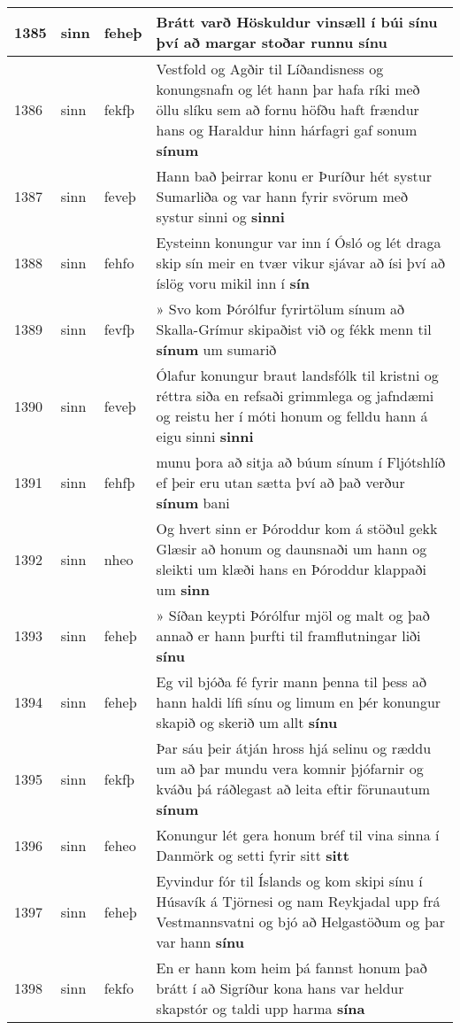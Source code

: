 \documentclass{article}
\begin{document}
\begin{longtable}{p{1cm}|p{1cm}|p{1cm}|p{13cm}}
\hline
1385&sinn&feheþ&Brátt varð Höskuldur vinsæll í búi sínu því að margar stoðar runnu \textbf{sínu} \\
\hline
1386&sinn&fekfþ&Vestfold og Agðir til Líðandisness og konungsnafn og lét hann þar hafa ríki með öllu slíku sem að fornu höfðu haft frændur hans og Haraldur hinn hárfagri gaf sonum \textbf{sínum} \\
\hline
1387&sinn&feveþ&Hann bað þeirrar konu er Þuríður hét systur Sumarliða og var hann fyrir svörum með systur sinni og \textbf{sinni} \\
\hline
1388&sinn&fehfo&Eysteinn konungur var inn í Ósló og lét draga skip sín meir en tvær vikur sjávar að ísi því að íslög voru mikil inn í \textbf{sín} \\
\hline
1389&sinn&fevfþ&» Svo kom Þórólfur fyrirtölum sínum að Skalla-Grímur skipaðist við og fékk menn til \textbf{sínum} um sumarið\\
\hline
1390&sinn&feveþ&Ólafur konungur braut landsfólk til kristni og réttra siða en refsaði grimmlega og jafndæmi og reistu her í móti honum og felldu hann á eigu sinni \textbf{sinni} \\
\hline
1391&sinn&fehfþ&munu þora að sitja að búum sínum í Fljótshlíð ef þeir eru utan sætta því að það verður \textbf{sínum} bani\\
\hline
1392&sinn&nheo&Og hvert sinn er Þóroddur kom á stöðul gekk Glæsir að honum og daunsnaði um hann og sleikti um klæði hans en Þóroddur klappaði um \textbf{sinn} \\
\hline
1393&sinn&feheþ&» Síðan keypti Þórólfur mjöl og malt og það annað er hann þurfti til framflutningar liði \textbf{sínu} \\
\hline
1394&sinn&feheþ&Eg vil bjóða fé fyrir mann þenna til þess að hann haldi lífi sínu og limum en þér konungur skapið og skerið um allt \textbf{sínu} \\
\hline
1395&sinn&fekfþ&Þar sáu þeir átján hross hjá selinu og ræddu um að þar mundu vera komnir þjófarnir og kváðu þá ráðlegast að leita eftir förunautum \textbf{sínum} \\
\hline
1396&sinn&feheo&Konungur lét gera honum bréf til vina sinna í Danmörk og setti fyrir sitt \textbf{sitt} \\
\hline
1397&sinn&feheþ&Eyvindur fór til Íslands og kom skipi sínu í Húsavík á Tjörnesi og nam Reykjadal upp frá Vestmannsvatni og bjó að Helgastöðum og þar var hann \textbf{sínu} \\
\hline
1398&sinn&fekfo&En er hann kom heim þá fannst honum það brátt í að Sigríður kona hans var heldur skapstór og taldi upp harma \textbf{sína} \\

\end{longtable}
\end{document}
